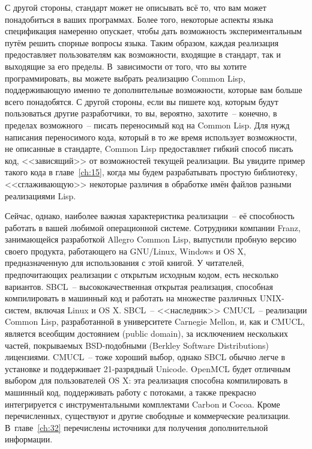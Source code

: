 С другой стороны, стандарт может не описывать всё то, что вам может понадобиться в ваших
программах. Более того, некоторые аспекты языка спецификация намеренно опускает, чтобы
дать возможность экспериментальным путём решить спорные вопросы языка.  Таким образом,
каждая реализация предоставляет пользователям как возможности, входящие в стандарт, так и
выходящие за его пределы. В~зависимости от того, что вы хотите программировать, вы можете
выбрать реализацию Common Lisp, поддерживающую именно те дополнительные возможности,
которые вам больше всего понадобятся. С другой стороны, если вы пишете код, которым будут
пользоваться другие разработчики, то вы, вероятно, захотите~-- конечно, в пределах
возможного~-- писать переносимый код на Common Lisp. Для нужд написания переносимого кода,
который в то же время использует возможности, не описанные в стандарте, Common Lisp
предоставляет гибкий способ писать код, <<зависящий>> от возможностей текущей
реализации. Вы увидите пример такого кода в главе~\ref{ch:15}, когда мы будем
разрабатывать простую библиотеку, <<сглаживающую>> некоторые различия в обработке имён
файлов разными реализациями Lisp.

Сейчас, однако, наиболее важная характеристика реализации~-- её способность работать в
вашей любимой операционной системе. Сотрудники компании Franz, занимающейся разработкой
Allegro Common Lisp, выпустили пробную версию своего продукта, работающего на GNU/Linux,
Windows и OS X, предназначенную для использования с этой книгой. У читателей,
предпочитающих реализации с открытым исходным кодом, есть несколько
вариантов. SBCL~-- высококачественная открытая
реализация, способная компилировать в машинный код и работать на множестве различных
UNIX-систем, включая Linux и OS X. SBCL~-- <<наследник>> CMUCL~-- реализации Common Lisp, разработанной в университете Carnegie Mellon,
и, как и CMUCL, является всеобщим достоянием (public domain), за исключением нескольких
частей, покрываемых BSD-подобными (Berkley Software Distributions) лицензиями. CMUCL~--
тоже хороший выбор, однако SBCL обычно легче в установке и поддерживает 21-разрядный
Unicode. OpenMCL будет отличным выбором для пользователей OS X: эта
реализация способна компилировать в машинный код, поддерживать работу с потоками, а также
прекрасно интегрируется с инструментальными комплектами Carbon и Cocoa. Кроме
перечисленных, существуют и другие свободные и коммерческие реализации. В~главе~\ref{ch:32}
перечислены источники для получения дополнительной информации.


